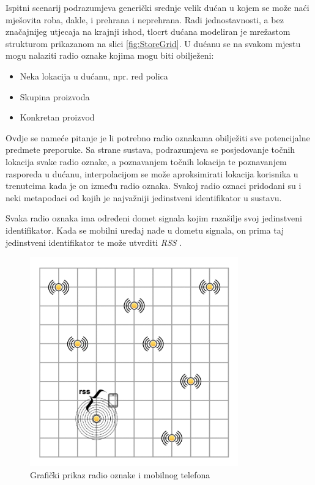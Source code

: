 \documentclass[times, utf8, diplomski, numeric]{fer}
\begin{document}
Ispitni scenarij podrazumjeva generički srednje velik dućan u kojem se
može naći mješovita roba, dakle, i prehrana i neprehrana. Radi jednostavnosti, a
bez značajnijeg utjecaja na krajnji ishod, tlocrt dućana modeliran je mrežastom
strukturom prikazanom na slici \ref{fig:StoreGrid}. U dućanu se na svakom mjestu
mogu nalaziti radio oznake  kojima mogu biti obilježeni:
\begin{itemize}
  \item Neka lokacija u dućanu, npr. red polica
  \item Skupina proizvoda
  \item Konkretan proizvod
\end{itemize}
Ovdje se nameće pitanje je li potrebno radio oznakama obilježiti sve
potencijalne predmete preporuke. Sa strane sustava, podrazumjeva se
posjedovanje točnih lokacija svake radio oznake, a poznavanjem točnih lokacija
te poznavanjem rasporeda u dućanu, interpolacijom se može aproksimirati lokacija
korisnika u trenutcima kada je on između radio oznaka. Svakoj radio oznaci
pridodani su i neki metapodaci od kojih je najvažniji jedinstveni identifikator
u sustavu.

Svaka radio oznaka ima određeni domet signala kojim razašilje 
svoj jedinstveni identifikator. Kada se mobilni uređaj nađe u dometu signala, on
prima taj jedinstveni identifikator te može utvrditi \emph{RSS} . 

\begin{figure}[!htb]
	\centering
	\includegraphics[width=9cm]{images/gridbeacons1cell.png}
	\caption{Grafički prikaz radio oznake i mobilnog telefona}
	\label{fig:RssOneCell}
\end{figure}
\end{document}
